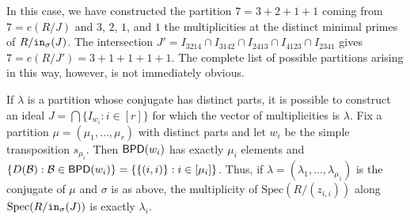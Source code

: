 \documentclass[12pt,reqno]{amsart}
\newtheorem{Main Conjecture}[theorem]{Main Conjecture}
\theoremstyle{remark}
\newenvironment{example}
  {\pushQED{\qed}\renewcommand{\qedsymbol}{$\diamondsuit$}\examplex}
  {\popQED\endexamplex}
\theoremstyle{plain}
\newcommand{\init}{{\tt in}}
\newcommand{\bpd}{{\sf BPD}}
\newcommand{\spec}{{\mbox{Spec}}}
\begin{document}
\begin{example}
In this case, we have constructed the partition $7 = 3+2+1+1$ coming from $7 = e(R/J)$ and $3$, $2$, $1$, and $1$ the multiplicities at the distinct minimal primes of $R/\init_\sigma(J)$.  The intersection $J' = I_{3214} \cap I_{3142} \cap I_{2413} \cap I_{4123} \cap I_{2341}$ gives $7 = e(R/J') = 3+1+1+1+1$. The complete list of possible partitions arising in this way, however, is not immediately obvious. 
\end{example} 

\begin{example}
If $\lambda$ is a partition whose conjugate has distinct parts, it is possible to construct an ideal 
$J= \bigcap \{I_{w_i}:i\in[r]\}$
for which the vector of multiplicities is $\lambda$.  Fix a partition $\mu=(\mu_1,\ldots,\mu_r)$ with distinct parts and let $w_i$  be the simple transposition $s_{\mu_i}$.  Then $\bpd(w_i)$ has exactly $\mu_i$ elements and $\{D(\mathcal B):\mathcal B\in \bpd(w_i)\}=\{\{(i,i)\}:i\in[\mu_i]\}$.  Thus, if $\lambda=(\lambda_1,\ldots, \lambda_{\mu_1})$ is the conjugate of $\mu$ and $\sigma$ is as above,  the multiplicity of $\spec(R/(z_{i,i}))$ along $\spec(R/\init_\sigma(J))$ is exactly $\lambda_i$.
\end{example}

 

\end{document}
